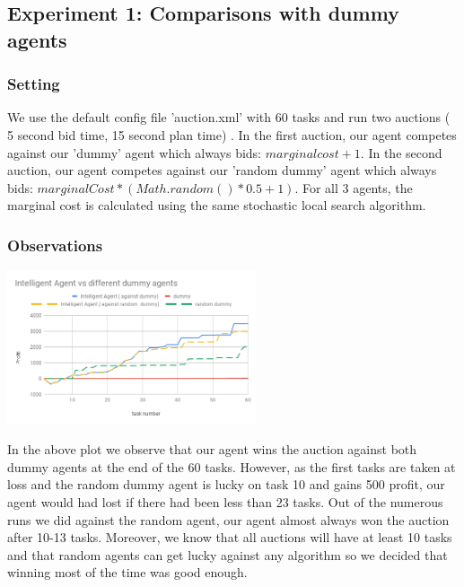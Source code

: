 \documentclass[11pt]{article}
\begin{document}
  \subsection{Experiment 1: Comparisons with dummy agents}


  \subsubsection{Setting}

  We use the default config file 'auction.xml' with 60 tasks and run two auctions ( 5 second bid time, 15 second plan time) . In the first auction, our agent competes against our 'dummy' agent which always bids: $marginal cost + 1$.
  In the second auction, our agent competes against our 'random dummy' agent which always bids: $marginalCost * (Math.random() * 0.5 + 1)$. For all 3 agents, the marginal cost is calculated using the same stochastic local search algorithm.

  \subsubsection{Observations}


  \includegraphics[width=0.55\textwidth]{dummy.png}

  In the above plot we observe that our agent wins the auction against both dummy agents at the end of the 60 tasks. However, as the first tasks are taken at loss and the random dummy agent is lucky on task 10 and gains 500 profit, our agent would had lost if there had been less than 23 tasks. Out of the numerous runs we did against the random agent, our agent almost always won the auction after 10-13 tasks. Moreover, we know that all auctions will have at least 10 tasks and that random agents can get lucky against any algorithm so we decided that winning most of the time was good enough.
\end{document}

